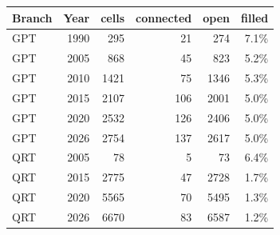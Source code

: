 \begin{tabular}{@{}lrrrrr@{}}\toprule
Branch & Year & cells & connected & open & filled \\\midrule
GPT & 1990 & 295 & 21 & 274 & 7.1\% \\
GPT & 2005 & 868 & 45 & 823 & 5.2\% \\
GPT & 2010 & 1421 & 75 & 1346 & 5.3\% \\
GPT & 2015 & 2107 & 106 & 2001 & 5.0\% \\
GPT & 2020 & 2532 & 126 & 2406 & 5.0\% \\
GPT & 2026 & 2754 & 137 & 2617 & 5.0\% \\
QRT & 2005 & 78 & 5 & 73 & 6.4\% \\
QRT & 2015 & 2775 & 47 & 2728 & 1.7\% \\
QRT & 2020 & 5565 & 70 & 5495 & 1.3\% \\
QRT & 2026 & 6670 & 83 & 6587 & 1.2\% \\
\bottomrule\end{tabular}

